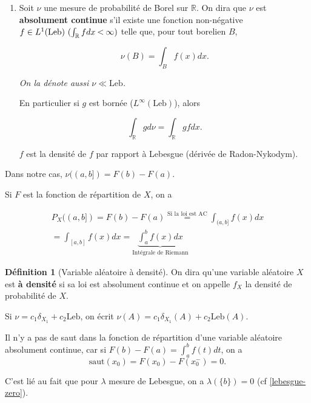 \documentclass[french]{book}
\theoremstyle{definition}
\newtheorem{protodefinition}{Définition}[section]
\newenvironment{definition}
    {\colorlet{shadecolor}{green!5}\begin{shaded}\begin{protodefinition}}
    {\end{protodefinition}\end{shaded}}
\theoremstyle{remark}
\newcommand{\lesss}{\rotatebox[origin=c]{90}{$\land$}}
\newcommand{\less}{\ \lesss\ }
\begin{document}
\begin{enumerate}
  \item Soit $\nu$ une mesure de probabilité de Borel sur $\mathbb{R}$. On dira que $\nu$ est \textbf{absolument continue} s'il existe une fonction non-négative $f \in L ^{1}(\text{Leb}) \ (\int_{\mathbb{R}}^{} f dx \less \infty )$ telle que, pour tout borelien $B$,

  \begin{equation*}
    \nu(B) = \int_{B}^{} f(x) dx.
  \end{equation*}

  \emph{On la dénote aussi $\nu \ll \text{Leb}$.}

  En particulier si $g$ est bornée ($L ^{\infty}(\text{Leb})$), alors

  \begin{equation*}
    \int_{\mathbb{R}}^{} g d \nu = \int_{\mathbb{R}}^{} gf dx.
  \end{equation*}

  $f$ est la densité de $f$ par rapport à Lebesgue (dérivée de Radon-Nykodym).

\end{enumerate}

Dans notre cas, $\nu((a,b]) = F(b)-F(a)$.

Si $F$ est la fonction de répartition de $X$, on a

\begin{gather*}
  P_X((a,b]) = F(b)-F(a) \stackrel{\text{Si la loi est AC}}{=} \int_{(a,b]}^{} f(x)dx \\
   = \int_{[a,b]}^{} f(x) dx = \underbrace{\int_{a}^{b} f(x) dx }_{\text{Intégrale de Riemann}}
\end{gather*}

\begin{definition}[Variable aléatoire à densité]
  On dira qu'une variable aléatoire $X$ est \textbf{à densité} si sa loi est absolument continue et on appelle $f_X$ la densité de probabilité de $X$.
\end{definition}

Si $\nu = c_1 \delta _{X_1} + c_2 \text{Leb}$, on écrit $\nu(A) = c_1 \delta _{X_1}(A) + c_2 \text{Leb} (A)$.

Il n'y a pas de saut dans la fonction de répartition d'une variable aléatoire absolument continue, car si $F(b) - F(a) = \int_{a}^{b} f(t) dt $, on a $$\text{saut}(x_0) = F(x_0) - F(x_0 ^{-}) = 0.$$

C'est lié au fait que pour $\lambda$ mesure de Lebesgue, on a $\lambda (\{ b \} ) = 0$ (cf \ref{lebesgue-zero}).
\end{document}
